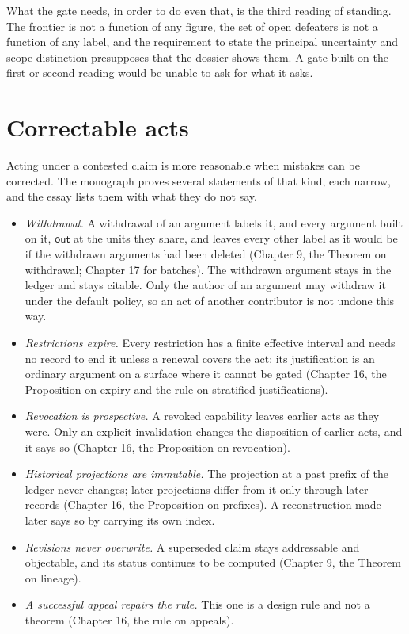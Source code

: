 \documentclass[11pt]{article}
\begin{document}
What the gate needs, in order to do even that, is the third reading of standing. The frontier is not a function of any figure, the set of open defeaters is not a function of any label, and the requirement to state the principal uncertainty and scope distinction presupposes that the dossier shows them. A gate built on the first or second reading would be unable to ask for what it asks.

\section{Correctable acts}\label{sec:correctable}

Acting under a contested claim is more reasonable when mistakes can be corrected. The monograph proves several statements of that kind, each narrow, and the essay lists them with what they do not say.

\begin{itemize}
\item \emph{Withdrawal.} A withdrawal of an argument labels it, and every argument built on it, $\mathsf{out}$ at the units they share, and leaves every other label as it would be if the withdrawn arguments had been deleted (Chapter 9, the Theorem on withdrawal; Chapter 17 for batches). The withdrawn argument stays in the ledger and stays citable. Only the author of an argument may withdraw it under the default policy, so an act of another contributor is not undone this way.
\item \emph{Restrictions expire.} Every restriction has a finite effective interval and needs no record to end it unless a renewal covers the act; its justification is an ordinary argument on a surface where it cannot be gated (Chapter 16, the Proposition on expiry and the rule on stratified justifications).
\item \emph{Revocation is prospective.} A revoked capability leaves earlier acts as they were. Only an explicit invalidation changes the disposition of earlier acts, and it says so (Chapter 16, the Proposition on revocation).
\item \emph{Historical projections are immutable.} The projection at a past prefix of the ledger never changes; later projections differ from it only through later records (Chapter 16, the Proposition on prefixes). A reconstruction made later says so by carrying its own index.
\item \emph{Revisions never overwrite.} A superseded claim stays addressable and objectable, and its status continues to be computed (Chapter 9, the Theorem on lineage).
\item \emph{A successful appeal repairs the rule.} This one is a design rule and not a theorem (Chapter 16, the rule on appeals).
\end{itemize}
\end{document}
